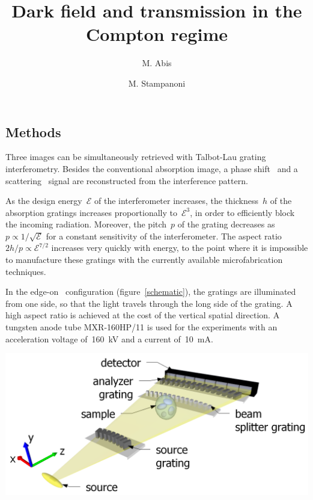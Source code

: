 \documentclass[a4paper, english]{article}
\newenvironment{multicolfigure}
  {\par\medskip\noindent\minipage{\linewidth}}
  {\endminipage\par\medskip}
\begin{document}
\title{Dark field and transmission in the Compton regime}
\author[1,2]{M. Abis}
\author[1,2]{M. Stampanoni}
\date{}

\maketitle
\thispagestyle{empty}
\begin{multicols}{2}
    \section{Methods}
    Three images can be simultaneously retrieved with Talbot-Lau grating interferometry.
    Besides the conventional absorption image, a phase shift~\supercite{David2002}
    and a scattering~\supercite{Pfeiffer2006} signal
    are reconstructed from the interference pattern.

    As the design energy~$\mathcal{E}$ of the interferometer
    increases, the thickness~$h$ of the absorption gratings increases
    proportionally to~$\mathcal{E}^3$, in order to efficiently block the
    incoming radiation. Moreover, the pitch~$p$ of the grating decreases
    as~$p \propto 1/\sqrt{\mathcal{E}}$ for a constant sensitivity of the
    interferometer. The aspect ratio $2h / p \propto \mathcal{E}^{7/2}$
    increases very quickly with energy, to the point where it is impossible
    to manufacture these gratings with the currently available
    microfabrication techniques.

    In the edge-on~\supercite{david2014method} configuration
    (figure~\ref{schematic}), the gratings are illuminated from one side, so
    that the light travels through the long side of the grating. A high
    aspect ratio is achieved at the cost of the vertical spatial direction.
    A tungsten anode tube \textsc{MXR-160HP/11} is used for the experiments
    with an acceleration voltage of~\SI{160}{\kilo\volt} and a current
    of~\SI{10}{\milli\ampere}. 
    \begin{multicolfigure}
        \includegraphics[width=.95\columnwidth]{figures/hDPC_setup.png}
        \label{schematic} \end{multicolfigure}


\end{multicols}
\end{document}
